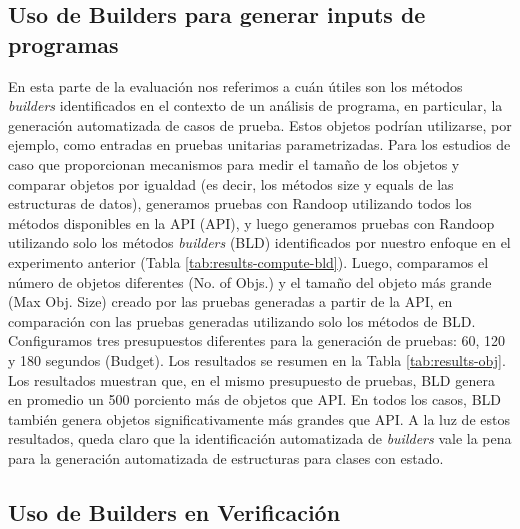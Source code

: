 \subsection{Uso de Builders para generar inputs de programas}
En esta parte de la evaluación nos referimos a cuán útiles son los métodos \emph{builders} identificados en el contexto de un análisis de programa, en particular, la generación automatizada de casos de prueba. Estos objetos podrían utilizarse, por ejemplo, como entradas en pruebas unitarias parametrizadas. Para los estudios de caso que proporcionan mecanismos para medir el tamaño de los objetos y comparar objetos por igualdad (es decir, los métodos size y equals de las estructuras de datos), generamos pruebas con Randoop utilizando todos los métodos disponibles en la API (API), y luego generamos pruebas con Randoop utilizando solo los métodos \emph{builders} (BLD) identificados por nuestro enfoque en el experimento anterior (Tabla \ref{tab:results-compute-bld}). Luego, comparamos el número de objetos diferentes (No. of Objs.) y el tamaño del objeto más grande (Max Obj. Size) creado por las pruebas generadas a partir de la API, en comparación con las pruebas generadas utilizando solo los métodos de BLD. Configuramos tres presupuestos diferentes para la generación de pruebas: 60, 120 y 180 segundos (Budget). Los resultados se resumen en la Tabla \ref{tab:results-obj}. Los resultados muestran que, en el mismo presupuesto de pruebas, BLD genera en promedio un 500 porciento más de objetos que API. En todos los casos, BLD también genera objetos significativamente más grandes que API. A la luz de estos resultados, queda claro que la identificación automatizada de \emph{builders} vale la pena para la generación automatizada de estructuras para clases con estado.



\subsection{Uso de Builders en Verificación}

